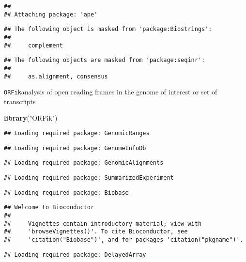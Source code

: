 \documentclass[]{article}
\newenvironment{Shaded}{\begin{snugshade}}{\end{snugshade}}
\newcommand{\KeywordTok}[1]{\textcolor[rgb]{0.13,0.29,0.53}{\textbf{#1}}}
\newcommand{\NormalTok}[1]{#1}
\newcommand{\StringTok}[1]{\textcolor[rgb]{0.31,0.60,0.02}{#1}}
\begin{document}
\begin{verbatim}
## 
## Attaching package: 'ape'
\end{verbatim}

\begin{verbatim}
## The following object is masked from 'package:Biostrings':
## 
##     complement
\end{verbatim}

\begin{verbatim}
## The following objects are masked from 'package:seqinr':
## 
##     as.alignment, consensus
\end{verbatim}

\texttt{ORFik}analysis of open reading frames in the genome of interest
or set of transcripts

\begin{Shaded}
\begin{Highlighting}[]
\KeywordTok{library}\NormalTok{(}\StringTok{"ORFik"}\NormalTok{)}
\end{Highlighting}
\end{Shaded}

\begin{verbatim}
## Loading required package: GenomicRanges
\end{verbatim}

\begin{verbatim}
## Loading required package: GenomeInfoDb
\end{verbatim}

\begin{verbatim}
## Loading required package: GenomicAlignments
\end{verbatim}

\begin{verbatim}
## Loading required package: SummarizedExperiment
\end{verbatim}

\begin{verbatim}
## Loading required package: Biobase
\end{verbatim}

\begin{verbatim}
## Welcome to Bioconductor
## 
##     Vignettes contain introductory material; view with
##     'browseVignettes()'. To cite Bioconductor, see
##     'citation("Biobase")', and for packages 'citation("pkgname")'.
\end{verbatim}

\begin{verbatim}
## Loading required package: DelayedArray
\end{verbatim}
\end{document}
